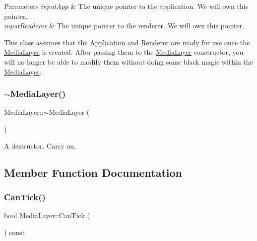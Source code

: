 \begin{DoxyParams}{Parameters}
{\em input\+App} & The unique pointer to the application. We will own this pointer. \\
\hline
{\em input\+Renderer} & The unique pointer to the renderer. We will own this pointer.\\
\hline
\end{DoxyParams}
This class assumes that the \hyperlink{class_application}{Application} and \hyperlink{class_renderer}{Renderer} are ready for use once the \hyperlink{class_media_layer}{Media\+Layer} is created. After passing them to the \hyperlink{class_media_layer}{Media\+Layer} constructor, you will no longer be able to modify them without doing some black magic within the \hyperlink{class_media_layer}{Media\+Layer}. \hypertarget{class_media_layer_a0c64e2d0a1c7b34b5457a0c57b69bbb1}{}\label{class_media_layer_a0c64e2d0a1c7b34b5457a0c57b69bbb1} 
\subsubsection{\texorpdfstring{$\sim$\+Media\+Layer()}{~MediaLayer()}}
{\footnotesize\ttfamily Media\+Layer\+::$\sim$\+Media\+Layer (\begin{DoxyParamCaption}{ }\end{DoxyParamCaption})}



A destructor. Carry on. 



\subsection{Member Function Documentation}
\hypertarget{class_media_layer_a023b4033ca8a44d25c6e37a0ff4178e8}{}\label{class_media_layer_a023b4033ca8a44d25c6e37a0ff4178e8} 
\subsubsection{\texorpdfstring{Can\+Tick()}{CanTick()}}
{\footnotesize\ttfamily bool Media\+Layer\+::\+Can\+Tick (\begin{DoxyParamCaption}{ }\end{DoxyParamCaption}) const}



